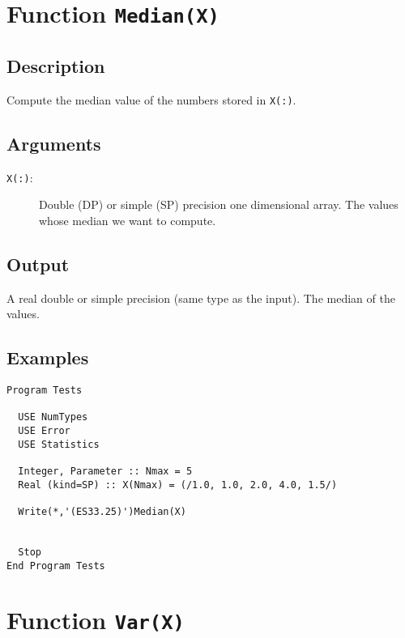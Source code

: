 \section{Function \texttt{Median(X)}}

\subsection{Description}

Compute the median value of the numbers stored in \texttt{X(:)}.

\subsection{Arguments}

\begin{description}
\item[\texttt{X(:)}:] Double (DP) or simple (SP) precision one
  dimensional array. The values  whose median we want to compute.
\end{description}

\subsection{Output}

A real double or simple precision (same type as the input). The median
of the values.

\subsection{Examples}

\begin{lstlisting}[emph=Median,
                   emphstyle=\color{blue},
                   frame=trBL,
                   caption=Computing the Median of a vector of numbers.,
                   label=mean]
Program Tests

  USE NumTypes
  USE Error
  USE Statistics

  Integer, Parameter :: Nmax = 5
  Real (kind=SP) :: X(Nmax) = (/1.0, 1.0, 2.0, 4.0, 1.5/)  

  Write(*,'(ES33.25)')Median(X)


  Stop
End Program Tests
\end{lstlisting}


\section{Function \texttt{Var(X)}}

